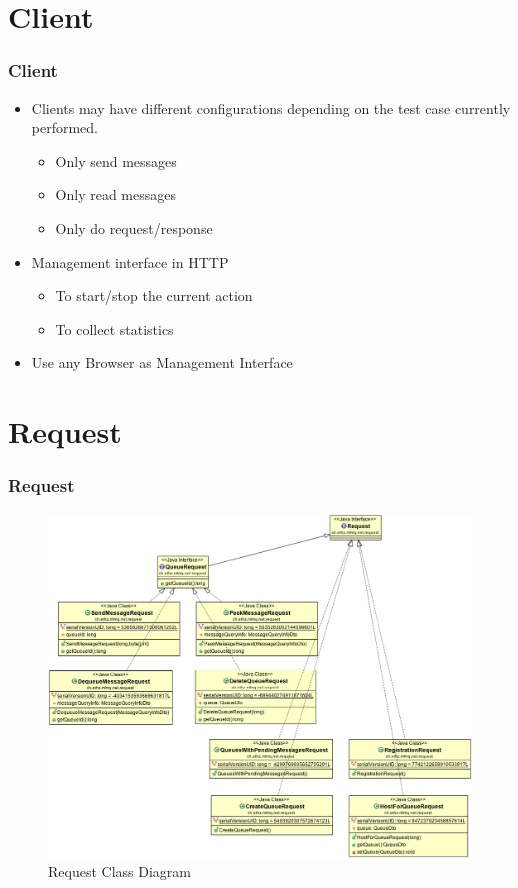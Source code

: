 \documentclass{beamer}
\begin{document}
\section{Client}
\begin{frame}
\frametitle{Client}
\begin{itemize}
\item Clients may have different configurations depending on the test case currently performed.
\begin{itemize}
\item{Only send messages}
\item{Only read messages}
\item{Only do request/response}
\end{itemize}

\item Management interface in HTTP
\begin{itemize}
\item{To start/stop the current action}
\item{To collect statistics}
\end{itemize}
\item Use any Browser as Management Interface
\end{itemize}
\end{frame}





\section{Request}
\begin{frame}
\frametitle{Request}

\begin{figure}
  \begin{center}
    \includegraphics[scale=0.25]{../../class_diagrams/Request.png}
  \end{center}
  \caption{Request Class Diagram}
  \label{fig:db-schema}
\end{figure}

\end{frame}
\end{document}
